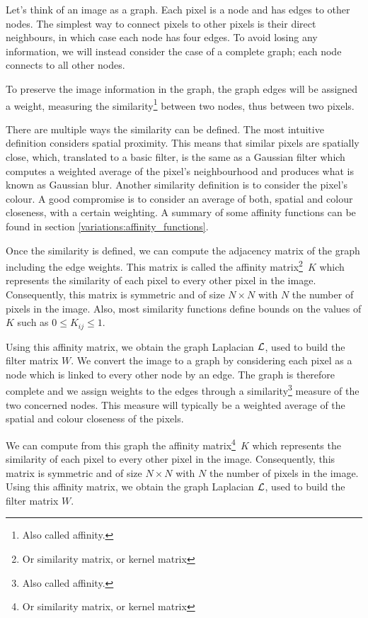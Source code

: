 \ifthesis
 Let's think of an image as a graph.
 Each pixel is a node and has edges to other nodes.
 The simplest way to connect pixels to other pixels is their direct neighbours, in which case each node has four edges.
 To avoid losing any information, we will instead consider the case of a complete graph; each node connects to all other nodes.

 To preserve the image information in the graph, the graph edges will be assigned a weight, measuring the similarity\footnote{Also called affinity.} between two nodes, thus between two pixels.

 There are multiple ways the similarity can be defined.
 The most intuitive definition considers spatial proximity.
 This means that similar pixels are spatially close, which, translated to a basic filter, is the same as a Gaussian filter which computes a weighted average of the pixel's neighbourhood and produces what is known as Gaussian blur.
 Another similarity definition is to consider the pixel's colour.
 A good compromise is to consider an average of both, spatial and colour closeness, with a certain weighting.
 A summary of some affinity functions can be found in section \ref{variations:affinity_functions}.

 Once the similarity is defined, we can compute the adjacency matrix of the graph including the edge weights.
 This matrix is called the affinity matrix\footnote{Or similarity matrix, or kernel matrix}\ \(K\) which represents the similarity of each pixel to every other pixel in the image.
 Consequently, this matrix is symmetric and of size \(N \times N\) with \(N\) the number of pixels in the image.
 Also, most similarity functions define bounds on the values of \(K\) such as \(0 \le K_{ij} \le 1\).

 Using this affinity matrix, we obtain the graph Laplacian \(\operatorname{\mathcal{L}}\), used to build the filter matrix \(W\).
\else
 We convert the image to a graph by considering each pixel as a node which is linked to every other node by an edge.
 The graph is therefore complete and we assign weights to the edges through a similarity\footnote{Also called affinity.} measure of the two concerned nodes.
 This measure will typically be a weighted average of the spatial and colour closeness of the pixels.

 We can compute from this graph the affinity matrix\footnote{Or similarity matrix, or kernel matrix}\ \(K\) which represents the similarity of each pixel to every other pixel in the image.
 Consequently, this matrix is symmetric and of size \(N \times N\) with \(N\) the number of pixels in the image.
 Using this affinity matrix, we obtain the graph Laplacian \(\operatorname{\mathcal{L}}\), used to build the filter matrix \(W\).
\fi
